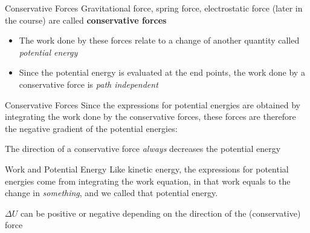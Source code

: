 \documentclass[12pt,compress,aspectratio=169]{beamer}
\newcommand{\mb}[1]{\ensuremath\mathbf{#1}}
\newcommand{\eq}[2]{\vspace{#1}{\Large\begin{displaymath}#2\end{displaymath}}}
\begin{document}
\begin{frame}{Conservative Forces}
  Gravitational force, spring force,  electrostatic force (later in the
  course) are called \textbf{conservative forces}
  \begin{itemize}
  \item The work done by these forces relate to a change of another quantity
    called \emph{potential energy}
  \item Since the potential energy is evaluated at the end points, the work
    done by a conservative force is \emph{path independent}
%    
  \end{itemize}
\end{frame}



\begin{frame}{Conservative Forces}
  Since the expressions for potential energies are obtained by integrating the
  work done by the conservative forces, these forces are therefore the
  negative gradient of the potential energies:

  \eq{-.2in}{
    \boxed{\mb{F}=-\nabla U=
      -\frac{\partial U}{\partial x}\bm{\hat{\imath}}
      -\frac{\partial U}{\partial y}\bm{\hat{\jmath}}
      -\frac{\partial U}{\partial z}\hat{\bm{k}}
    }
  }

  The direction of a conservative force \emph{always} decreases the potential
  energy
\end{frame}




\begin{frame}{Work and Potential Energy}
  Like kinetic energy, the expressions for potential energies come from
  integrating the work equation, in that work equals to the change in
  \emph{something}, and we called that potential energy.

  \eq{-.2in}{
    \boxed{W_\mathrm{net}=-\Delta U}
  }

  $\Delta U$ can be positive or negative depending on the direction of the
  (conservative) force
\end{frame}
\end{document}
